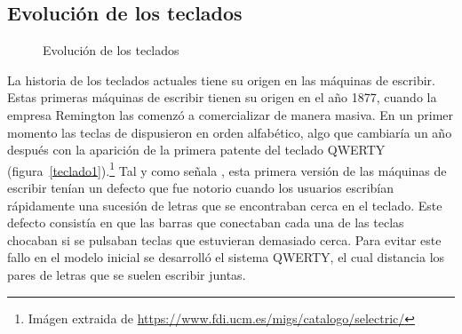\subsection{Evoluci\'on de los teclados}
\begin{figure}[t]
     \hfill
     \caption{Evoluci\'on de los teclados}
     \label{fig:primera}
   \end{figure}
La historia de los teclados actuales tiene su origen en las m\'aquinas de escribir. Estas primeras m\'aquinas de escribir tienen su origen en el a\~no 1877, cuando la empresa Remington las comenz\'o a comercializar de manera masiva. En un primer momento las teclas de dispusieron en orden alfab\'etico, algo que cambiar\'ia un a\~no despu\'es con la aparici\'on de la primera patente del teclado QWERTY (figura~\ref{teclado1}).\footnote{Im\'agen extraida de \url{https://www.fdi.ucm.es/migs/catalogo/selectric/}} Tal y como se\~nala \cite{jimmy}, esta primera versi\'on de las m\'aquinas de escribir ten\'ian un defecto que fue notorio cuando los usuarios escrib\'ian r\'apidamente una sucesi\'on de letras que se encontraban cerca en el teclado. Este defecto consist\'ia en que las barras que conectaban cada una de las teclas chocaban si se pulsaban teclas que estuvieran demasiado cerca.  Para evitar este fallo en el modelo inicial se desarroll\'o el sistema QWERTY, el cual distancia los pares de letras que se suelen escribir juntas.\\

